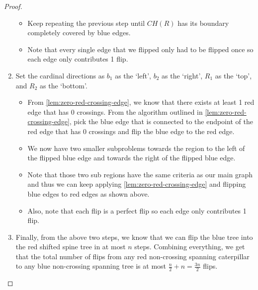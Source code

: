 \documentclass{article}
\begin{document}
\begin{proof}
\begin{enumerate}
\begin{itemize}
			      \item Keep repeating the previous step until $CH(R)$ has its boundary completely covered by blue edges.

			      \item Note that every single edge that we flipped only had to be flipped once so each edge only contributes 1 flip.
		      \end{itemize}

		\item Set the cardinal directions as $b_1$ as the `left', $b_2$ as the `right', $R_1$ as the `top', and $R_2$ as the `bottom'.

		      \begin{itemize}
			      \item From \ref{lem:zero-red-crossing-edge}, we know that there exists at least 1 red edge that has 0 crossings. From the algorithm outlined in \ref{lem:zero-red-crossing-edge}, pick the blue edge that is connected to the endpoint of the red edge that has 0 crossings and flip the blue edge to the red edge.
			      \item We now have two smaller subproblems towards the region to the left of the flipped blue edge and towards the right of the flipped blue edge.
			      \item Note that those two sub regions have the same criteria as our main graph and thus we can keep applying \ref{lem:zero-red-crossing-edge} and flipping blue edges to red edges as shown above.
			      \item Also, note that each flip is a perfect flip so each edge only contributes 1 flip.
		      \end{itemize}

		\item Finally, from the above two steps, we know that we can flip the blue tree into the red shifted spine tree in at most $n$ steps. Combining everything, we get that the total number of flips from any red non-crossing spanning caterpillar to any blue non-crossing spanning tree is at most $\frac{n}{2} + n = \frac{3n}{2}$ flips.
	\end{enumerate}
\end{proof}
\end{document}
